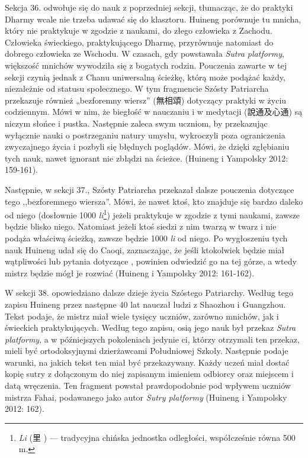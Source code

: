 Sekcja 36. odwołuje się do nauk z poprzedniej sekcji, tłumacząc, że do praktyki Dharmy wcale nie trzeba udawać się do klasztoru.
Huineng porównuje tu mnicha, który nie praktykuje w zgodzie z naukami, do złego człowieka z Zachodu.
Człowieka świeckiego, praktykującego Dharmę, przyrównuje natomiast do dobrego człowieka ze Wschodu.
W czasach, gdy powstawała \textit{Sutra platformy}, większość mnichów wywodziła się z bogatych rodzin.
Pouczenia zawarte w tej sekcji czynią jednak z Chanu uniwersalną ścieżkę, którą może podążać każdy, niezależnie od statusu społecznego.
W tym fragmencie Szósty Patriarcha przekazuje również „bezforemny wiersz” (無相頌) dotyczący praktyki w życiu codziennym.
Mówi w nim, że biegłość w nauczaniu i w medytacji (說通及心通) są niczym słońce i pustka.
Następnie zaleca swym uczniom, by przekazując wyłącznie nauki o postrzeganiu natury umysłu, wykroczyli poza ograniczenia zwyczajnego życia i pozbyli się błędnych poglądów. %
Mówi, że dzięki zgłębianiu tych nauk, nawet ignorant nie zbłądzi na ścieżce. %
(Huineng i Yampolsky 2012: 159-161).

Następnie, w sekcji 37., Szósty Patriarcha przekazał dalsze pouczenia dotyczące tego ,,bezforemnego wiersza''.
Mówi, że nawet ktoś, kto znajduje się bardzo daleko od niego (dosłownie 1000 \textit{li}\footnote{\textit{Li} (里 ) --- tradycyjna chińska jednostka odległości, współcześnie równa 500 m.}) jeżeli praktykuje w zgodzie z tymi naukami, zawsze będzie blisko niego.
Natomiast jeżeli ktoś siedzi z nim twarzą w twarz i nie podąża właściwą ścieżką, zawsze będzie 1000 \textit{li} od niego.
Po wygłoszeniu tych nauk Huineng udał się do Caoqi, zaznaczając, że jeśli ktokolwiek będzie miał wątpliwości lub pytania dotyczące , powinien odwiedzić go na tej górze, a wtedy mistrz będzie mógł je rozwiać %
(Huineng i Yampolsky 2012: 161-162).

W sekcji 38. opowiedziano dalsze dzieje życia Szóstego Patriarchy.
Według tego zapisu Huineng przez następne 40 lat nauczał ludzi z Shaozhou i Guangzhou.
Tekst podaje, że mistrz miał wiele tysięcy uczniów, zarówno mnichów, jak i świeckich praktykujących.
Według tego zapisu, osią jego nauk był przekaz \textit{Sutra platformy}, a w późniejszych pokoleniach jedynie ci, którzy otrzymali ten przekaz, mieli być ortodoksyjnymi dzierżawcami Południowej Szkoły.
Następnie podaje warunki, na jakich tekst ten miał być przekazywany.
Każdy uczeń miał dostać kopię sutry z dołączonym do niej zapisanym imieniem odbiorcy oraz miejscem i datą wręczenia.
Ten fragment powstał prawdopodobnie pod wpływem uczniów mistrza Fahai, podawanego jako autor \textit{Sutry platformy} %
(Huineng i Yampolsky 2012: 162).

